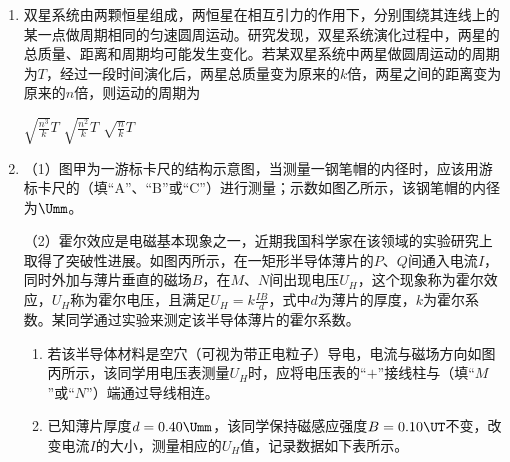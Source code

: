 \documentclass[\gkver]{gaokaozhenti}
\begin{document}
\begin{enumerate}
{四点中$c$点处的电势最低}
{$b$、$d$两点处的电场强度相同}
{将一试探电荷$+q$沿圆周由$a$点移至$c$点，$+q$的电势能减小}


\item
双星系统由两颗恒星组成，两恒星在相互引力的作用下，分别围绕其连线上的某一点做周期相同的匀速圆周运动。研究发现，双星系统演化过程中，两星的总质量、距离和周期均可能发生变化。若某双星系统中两星做圆周运动的周期为$T$，经过一段时间演化后，两星总质量变为原来的$k$倍，两星之间的距离变为原来的$n$倍，则运动的周期为

{$\sqrt{\frac{n^{3}}{k}}T$}
{$\sqrt{\frac{n^{2}}{k}}T$}
{$\sqrt{\frac{n}{k}}T$}


\item
（1）图甲为一游标卡尺的结构示意图，当测量一钢笔帽的内径时，应该用游标卡尺的（填“A”、“B”或“C”）进行测量；示数如图乙所示，该钢笔帽的内径为$\Umm$。


（2）霍尔效应是电磁基本现象之一，近期我国科学家在该领域的实验研究上取得了突破性进展。如图丙所示，在一矩形半导体薄片的$P$、$Q$间通入电流$I$，同时外加与薄片垂直的磁场$B$，在$M$、$N$间出现电压$U_{H}$，这个现象称为霍尔效应，$U_{H}$称为霍尔电压，且满足$U_{H}=k\frac{IB}{d}$，式中$d$为薄片的厚度，$k$为霍尔系数。某同学通过实验来测定该半导体薄片的霍尔系数。


\begin{enumerate}
	\item
	若该半导体材料是空穴（可视为带正电粒子）导电，电流与磁场方向如图丙所示，该同学用电压表测量$U_{H}$时，应将电压表的“$+$”接线柱与（填“$M$”或“$N$”）端通过导线相连。

	\item
	已知薄片厚度$d=0.40\Umm$，该同学保持磁感应强度$B=0.10\UT$不变，改变电流$I$的大小，测量相应的$U_{H}$值，记录数据如下表所示。


\end{enumerate}
\end{enumerate}
\end{document}
